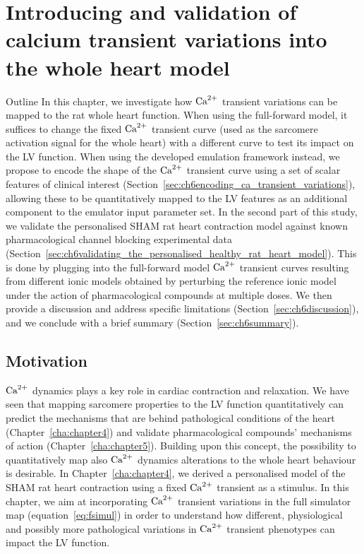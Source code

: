 \chapter{Introducing and validation of calcium transient variations into the whole heart model}\label{cha:chapter6}
%
%
%
\begin{remark}{Outline}
    In this chapter, we investigate how $\textrm{Ca}^{2+}$ transient variations can be mapped to the rat whole heart function. When using the full-forward model, it suffices to change the fixed $\textrm{Ca}^{2+}$ transient curve (used as the sarcomere activation signal for the whole heart) with a different curve to test its impact on the LV function. When using the developed emulation framework instead, we propose to encode the shape of the $\textrm{Ca}^{2+}$ transient curve using a set of scalar features of clinical interest (Section~\ref{sec:ch6encoding_ca_transient_variations}), allowing these to be quantitatively mapped to the LV features as an additional component to the emulator input parameter set. In the second part of this study, we validate the personalised SHAM rat heart contraction model against known pharmacological channel blocking experimental data (Section~\ref{sec:ch6validating_the_personalised_healthy_rat_heart_model}). This is done by plugging into the full-forward model $\textrm{Ca}^{2+}$ transient curves resulting from different ionic models obtained by perturbing the reference ionic model under the action of pharmacological compounds at multiple doses. We then provide a discussion and address specific limitations (Section~\ref{sec:ch6discussion}), and we conclude with a brief summary (Section~\ref{sec:ch6summary}).
\end{remark}


%
%
%
\section{Motivation}\label{sec:ch6motivation}
$\textrm{Ca}^{2+}$ dynamics plays a key role in cardiac contraction and relaxation. We have seen that mapping sarcomere properties to the LV function quantitatively can predict the mechanisms that are behind pathological conditions of the heart (Chapter~\ref{cha:chapter4}) and validate pharmacological compounds' mechanisms of action (Chapter~\ref{cha:chapter5}). Building upon this concept, the possibility to quantitatively map also $\textrm{Ca}^{2+}$ dynamics alterations to the whole heart behaviour is desirable. In Chapter~\ref{cha:chapter4}, we derived a personalised model of the SHAM rat heart contraction using a fixed $\textrm{Ca}^{2+}$ transient as a stimulus. In this chapter, we aim at incorporating $\textrm{Ca}^{2+}$ transient variations in the full simulator map (equation~\ref{eq:fsimul}) in order to understand how different, physiological and possibly more pathological variations in $\textrm{Ca}^{2+}$ transient phenotypes can impact the LV function.


